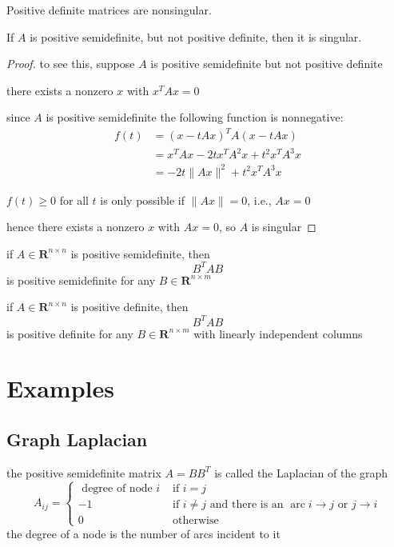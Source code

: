 \begin{theorem}
    Positive definite matrices are nonsingular.
\end{theorem}

\begin{theorem}
    If $A$ is positive semidefinite, but not positive definite, then it is singular.
\end{theorem}

\begin{proof}
    to see this, suppose $ A $ is positive semidefinite but not positive definite

    there exists a nonzero $ x $ with $ x^{T} A x=0 $


since $ A $ is positive semidefinite the following function is nonnegative:
$$
\begin{aligned}
f(t) &=(x-t A x)^{T} A(x-t A x) \\
&=x^{T} A x-2 t x^{T} A^{2} x+t^{2} x^{T} A^{3} x \\
&=-2 t\|A x\|^{2}+t^{2} x^{T} A^{3} x
\end{aligned}
$$

$ f(t) \geq 0 $ for all $ t $ is only possible if $ \|A x\|=0 $, i.e., $ A x=0 $

hence there exists a nonzero $ x $ with $ A x=0 $, so $ A $ is singular
\end{proof}

\begin{corollary}
    if $ A \in \mathbf{R}^{n \times n} $ is positive semidefinite, then
$$
B^{T} A B
$$
is positive semidefinite for any $ B \in \mathbf{R}^{n \times m} $
\end{corollary}

\begin{corollary}
    if $ A \in \mathbf{R}^{n \times n} $ is positive definite, then
$$
B^{T} A B
$$
is positive definite for any $ B \in \mathbf{R}^{n \times m} $ with linearly independent columns
\end{corollary}

\section{Examples}

\subsection{Graph Laplacian}

\begin{definition}
    the positive semidefinite matrix $ A=B B^{T} $ is called the Laplacian of the graph
$$
A_{i j}=\left\{\begin{array}{ll}
\text { degree of node } i & \text { if } i=j \\
-1 & \text { if } i \neq j \text { and there is an } \operatorname{arc} i \rightarrow j \text { or } j \rightarrow i \\
0 & \text { otherwise }
\end{array}\right.
$$
the degree of a node is the number of arcs incident to it
\end{definition}

